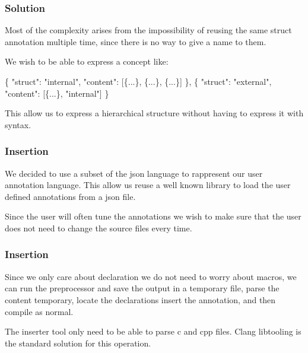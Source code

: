 \documentclass{beamer}
\begin{document}
\begin{frame}[fragile]
	\frametitle{Solution}
	\begin{block}{}
	Most of the complexity arises from the impossibility of reusing the same struct annotation multiple time, since there is no way to give a name to them.

	We wish to be able to express a concept like:
	\end{block}

	\begin{alertblock}{}
	\begin{semiverbatim}	
		\{
		\quad "struct": "internal",
		\quad "content": [\{...\}, \{...\}, \{...\}]
		\},
		\{
		\quad "struct": "external",
		\quad "content": [\{...\}, "internal"]
		\}
	\end{semiverbatim}
	\end{alertblock}

	\begin{block}{}
	This allow us to express a hierarchical structure without having to express it with syntax.
	\end{block}

\end{frame}
\begin{frame}[fragile]
	\frametitle{Insertion}
	\begin{block}{}
	We decided to use a subset of the json language to rappresent our user annotation language.
	This allow us reuse a well known library to load the user defined annotations from a json file.
	\end{block}
	\begin{block}{}
		Since the user will often tune the annotations we wish to make sure that the user does not need to change the source files every time. 
	\end{block}

\end{frame}
\begin{frame}[fragile]
	\frametitle{Insertion}
	\begin{block}{}
		Since we only care about declaration we do not need to worry about macros, we can run the preprocessor and save the output in a temporary file, parse the content temporary, locate the declarations insert the annotation, and then compile as normal. 
	\end{block}
	
	\begin{block}{}
		The inserter tool only need to be able to parse c and cpp files. Clang libtooling is the standard solution for this operation.
	\end{block}

\end{frame}
\end{document}
